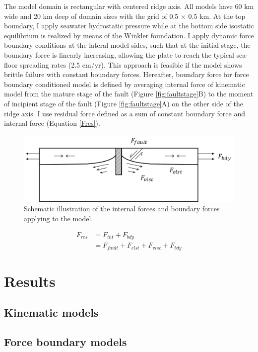 \documentclass[letterpaper,12pt,notitle]{memphisthesis}                     %
\begin{document}
The model domain is rectangular with centered ridge axis. All models have 60 km wide and 20 km deep of domain sizes with the grid of 0.5 $\times$ 0.5 km. At the top boundary, I apply seawater hydrostatic pressure while at the bottom side isostatic equilibrium is realized by means of the Winkler foundation. I apply dynamic force boundary conditions at the lateral model sides, such that at the initial stage, the boundary force is linearly increasing, allowing the plate to reach the typical sea-floor spreading rates (2.5 cm/yr). This approach is feasible if the model shows brittle failure with constant boundary forces. Hereafter, boundary force for force boundary conditioned model is defined by averaging internal force of kinematic model from the mature stage of the fault (Figure \ref{fig:faultstage}B) to the moment of incipient stage of the fault (Figure \ref{fig:faultstage}A) on the other side of the ridge axis. I use residual force defined as a sum of constant boundary force and internal force (Equation \ref{Fres}).

\begin{figure}[!htb]
	\centering
	\includegraphics[width=0.9\linewidth]{./figs/force.pdf}
	\caption{ Schematic illustration of the internal forces and boundary forces applying to the model.}
	\label{fig:forcescheme}
\end{figure}
\begin{align} \label{Fres}
F_{res} & = F_{int} + F_{bdy} \\
 & = F_{fault} + F_{elst} + F_{visc} + F_{bdy}
\end{align}

\chapter{Results}

\section{Kinematic models}


\section{Force boundary models}
\end{document}
